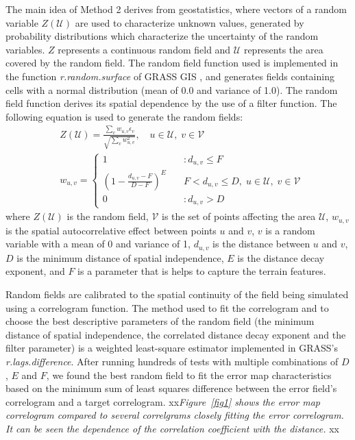 \documentclass{article}
\begin{document}
The main idea of Method 2 derives from geostatistics, where vectors of
a random variable $Z(\mathcal{U})$ are used to characterize unknown
values, generated by probability distributions which characterize the
uncertainty of the random variables. $Z$ represents a continuous
random field and $\mathcal{U}$ represents the area covered by the
random field.  The random field function used is implemented in the
function \textit{r.random.surface} \citep{Ehlschlaeger_1994} of GRASS
GIS \citep{Mitasova1996}, and generates fields containing cells with a normal
distribution (mean of 0.0 and variance of 1.0). The random field
function derives its spatial dependence by the use of a filter
function. The following equation is used to generate the random
fields:
\begin{align}
 &Z(\mathcal{U})= \frac{\sum_v w_{u,v}\epsilon_v}{\sqrt{\sum_v
      w_{u,v}^2}}, \quad u\in \mathcal{U}, \; v \in \mathcal{V}
  \\ &w_{u,v} = \left\{ \begin{array}{ll} 1 & \quad :d_{u,v} \le F
    \\ \left(1- \frac{d_{u,v} - F}{D - F} \right)^E & \quad F <
    d_{u,v} \le D, \; u \in \mathcal{U}, \; v \in \mathcal{V}\\ 0 &
    \quad :d_{u,v} > D
\end{array} \right.                                                    
\end{align}
where $Z(\mathcal{U})$ is the random field, $\mathcal{V}$ is the set
of points affecting the area $\mathcal{U}$, $w_{u,v}$ is the spatial
autocorrelative effect between points $u$ and $v$, $v$ is a random
variable with a mean of 0 and variance of 1, $d_{u,v}$ is the distance
between $u$ and $v$, $D$ is the minimum distance of spatial
independence, $E$ is the distance decay exponent, and $F$ is a
parameter that is helps to capture the terrain features.


Random fields are calibrated to the spatial continuity of the field
being simulated using a correlogram function. The method used to fit
the correlogram and to choose the best descriptive parameters of the
random field (the minimum distance of spatial independence, the
correlated distance decay exponent and the filter parameter) is a
weighted least-square estimator implemented in GRASS's
\textit{r.lags.difference}.  After running hundreds of tests with
multiple combinations of $D$, $E$ and $F$, we found the best random
field to fit the error map characteristics based on the minimum sum of
least squares difference between the error field's correlogram and a
target correlogram. xx\textit{Figure~\ref{fig1} shows the error map
correlogram compared to several correlgrams closely fitting the error 
correlogram. It can be seen the dependence of the correlation coefficient with 
the distance.  
}xx
\end{document}
